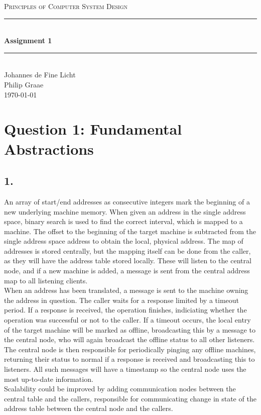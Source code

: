 \documentclass[12pt]{article}
\newcommand{\HRule}{\rule{\linewidth}{0.5mm}}
\begin{document}
\begin{center}
\textsc{\LARGE Principles of Computer System Design}\\[0.3cm] %
\HRule \\[0.4cm]
{ \huge \bfseries Assignment 1} %
\HRule \\[0.4cm]
\large
Johannes de Fine Licht %
\\Philip Graae
\\\today
\end{center}

\section*{Question 1: Fundamental Abstractions} %

\subsection*{1.} %

An array of start/end addresses as consecutive integers mark the beginning of a new underlying machine memory. When given an address in the single address space, binary search is used to find the correct interval, which is mapped to a machine. The offset to the beginning of the target machine is subtracted from the single address space address to obtain the local, physical address. The map of addresses is stored centrally, but the mapping itself can be done from the caller, as they will have the address table stored locally. These will listen to the central node, and if a new machine is added, a message is sent from the central address map to all listening clients. \\
When an address has been translated, a message is sent to the machine owning the address in question. The caller waits for a response limited by a timeout period. If a response is received, the operation finishes, indiciating whether the operation was successful or not to the caller. If a timeout occurs, the local entry of the target machine will be marked as offline, broadcasting this by a message to the central node, who will again broadcast the offline status to all other listeners. The central node is then responsible for periodically pinging any offline machines, returning their status to normal if a response is received and broadcasting this to listeners. All such messages will have a timestamp so the central node uses the most up-to-date information.\\
Scalability could be improved by adding communication nodes between the central table and the callers, responsible for communicating change in state of the address table between the central node and the callers.
\end{document}
